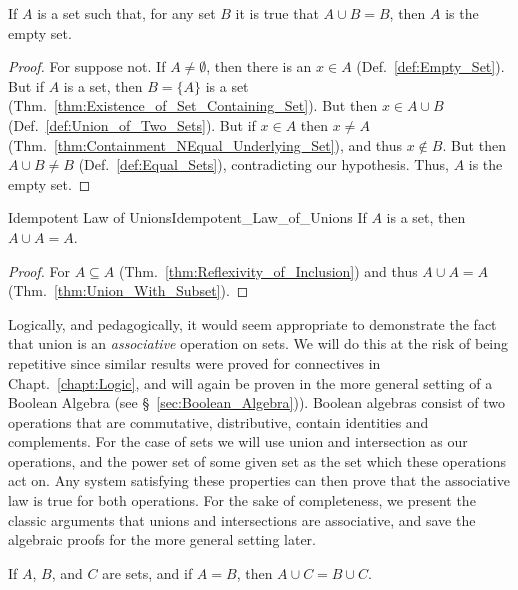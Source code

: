         \begin{theorem}
            \label{thm:Empty_Set_Is_Zero_for_Unions}%
            If $A$ is a set such that, for any set $B$ it is true that
            $A\cup{B}=B$, then $A$ is the empty set.
        \end{theorem}
        \begin{proof}
            For suppose not. If $A\ne\emptyset$, then there is an $x\in{A}$
            (Def.~\ref{def:Empty_Set}). But if $A$ is a set, then $B=\{A\}$ is a
            set (Thm.~\ref{thm:Existence_of_Set_Containing_Set}). But then
            $x\in{A}\cup{B}$ (Def.~\ref{def:Union_of_Two_Sets}). But if
            $x\in{A}$ then $x\ne{A}$
            (Thm.~\ref{thm:Containment_NEqual_Underlying_Set}), and thus
            $x\notin{B}$. But then $A\cup{B}\ne{B}$ (Def.~\ref{def:Equal_Sets}),
            contradicting our hypothesis. Thus, $A$ is the empty set.
        \end{proof}
        \begin{ltheorem}{Idempotent Law of Unions}{Idempotent_Law_of_Unions}
            If $A$ is a set, then $A\cup{A}=A$.
        \end{ltheorem}
        \begin{proof}
            For $A\subseteq{A}$ (Thm.~\ref{thm:Reflexivity_of_Inclusion}) and
            thus $A\cup{A}=A$ (Thm.~\ref{thm:Union_With_Subset}).
        \end{proof}
        Logically, and pedagogically, it would seem appropriate to demonstrate
        the fact that union is an \textit{associative} operation on sets. We
        will do this at the risk of being repetitive since similar results were
        proved for connectives in Chapt.~\ref{chapt:Logic}, and will again be
        proven in the more general setting of a Boolean Algebra
        (see \S~\ref{sec:Boolean_Algebra})). Boolean algebras consist of two
        operations that are commutative, distributive, contain identities and
        complements. For the case of sets we will use union and intersection as
        our operations, and the power set of some given set as the set which
        these operations act on. Any system satisfying these properties can then
        prove that the associative law is true for both operations. For the sake
        of completeness, we present the classic arguments that unions and
        intersections are associative, and save the algebraic proofs for the
        more general setting later.
        \begin{theorem}
            \label{thm:Union_with_Equal_Sets}%
            If $A$, $B$, and $C$ are sets, and if $A=B$, then
            $A\cup{C}=B\cup{C}$.
        \end{theorem}
